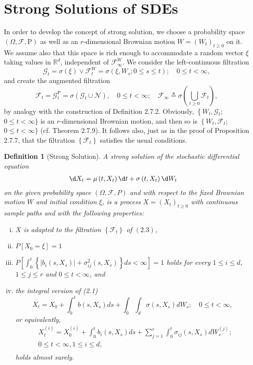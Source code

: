 \documentclass{report}
\newtheorem{definition}{Definition}[section]
\theoremstyle{nonumberplain}
\begin{document}
\section{Strong Solutions of SDEs}
In order to develop the concept of strong solution, we choose a probability space $(\Omega, \mathcal{F}, \mathrm{P})$ as well as an $r$-dimensional Brownian motion $W=(W_t)_{t\ge 0}$ on it. We assume also that this space is rich enough to accommodate a random vector $\xi$ taking values in $\mathbb{R}^d$, independent of $\mathcal{F}_{\infty}^W$.
We consider the left-continuous filtration
$$
\mathcal{G}_t = \sigma(\xi) \vee \mathcal{F}_t^W=\sigma\left(\xi, W_s ; 0 \leq s \leq t\right) ; \quad 0 \leq t<\infty,
$$
and create the augmented filtration
$$
\mathcal{F}_t = \mathcal{G}_t^\mathrm{P}=\sigma\left(\mathcal{G}_t \cup \mathcal{N}\right), \quad 0 \leq t<\infty ; \quad \mathscr{F}_{\infty} \triangleq \sigma\left(\bigcup_{t \geq 0} \mathcal{F}_t\right),
$$
by analogy with the construction of Definition 2.7.2. Obviously, $\left\{W_t, \mathcal{G}_t\right.$; $0 \leq t<\infty\}$ is an $r$-dimensional Brownian motion, and then so is $\left\{W_t, \mathscr{F}_t\right.$; $0 \leq t<\infty\}$ (cf. Theorem 2.7.9). It follows also, just as in the proof of Proposition 2.7.7, that the filtration $\left\{\mathscr{F}_t\right\}$ satisfies the usual conditions.
\begin{definition}[Strong Solution]
A strong solution of the stochastic differential equation
$$
\begin{aligned}
\d X_t &=\mu\left(t, X_t\right) \d t+\sigma\left(t, X_t\right) \d W_t
\end{aligned}
$$
on the given probability space $(\Omega, \mathscr{F}, P)$ and with respect to the fixed Brownian motion $W$ and initial condition $\xi$, is a process $X=\left(X_t\right)_{t\ge 0}$ with continuous sample paths and with the following properties:
\begin{enumerate}[(i)]
	\item $X$ is adapted to the filtration $\left\{\mathscr{F}_t\right\}$ of $(2.3)$,
	\item  $P\left[X_0=\xi\right]=1$
	\item  $P\left[\int_0^t\left\{\left|b_i\left(s, X_s\right)\right|+\sigma_{i j}^2\left(s, X_s\right)\right\} d s<\infty\right]=1$ holds for every $1 \leq i \leq d$, $1 \leq j \leq r$ and $0 \leq t<\infty$, and
	\item  the integral version of (2.1)
	$$
	X_t=X_0+\int_0^t b\left(s, X_s\right) d s+\int_0 \int_d \sigma\left(s, X_s\right) d W_s ; \quad 0 \leq t<\infty,
	$$
	or equivalently,
	$$
	\begin{aligned}
	& X_t^{(i)}=X_0^{(i)}+\int_0^t b_i\left(s, X_s\right) d s+\sum_{j=1}^r \int_0^t \sigma_{i j}\left(s, X_s\right) d W_s^{(j)} ; \\
	& 0 \leq t<\infty, 1 \leq i \leq d, \\
	&
	\end{aligned}
	$$
	holds almost surely.
\end{enumerate}
\end{definition}
\end{document}
